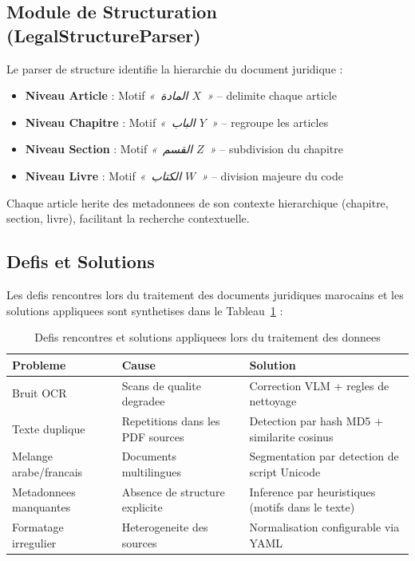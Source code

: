 \subsection{Module de Structuration (LegalStructureParser)}

Le parser de structure identifie la hierarchie du document juridique :

\begin{itemize}
    \item \textbf{Niveau Article} : Motif \textit{«~\textarabic{المادة} $X$~»} -- delimite chaque article
    \item \textbf{Niveau Chapitre} : Motif \textit{«~\textarabic{الباب} $Y$~»} -- regroupe les articles
    \item \textbf{Niveau Section} : Motif \textit{«~\textarabic{القسم} $Z$~»} -- subdivision du chapitre
    \item \textbf{Niveau Livre} : Motif \textit{«~\textarabic{الكتاب} $W$~»} -- division majeure du code
\end{itemize}

Chaque article herite des metadonnees de son contexte hierarchique (chapitre, section, livre), facilitant la recherche contextuelle.

\subsection{Defis et Solutions}

Les defis rencontres lors du traitement des documents juridiques marocains et les solutions appliquees sont synthetises dans le Tableau~\ref{tab:defis-solutions} :

\begin{table}[h]
\centering
\renewcommand{\arraystretch}{1.3}
\begin{tabular}{|p{3.5cm}|p{3.5cm}|p{4.5cm}|}
\hline
\rowcolor{LightBlue}
\textbf{\color{PrimaryBlue}Probleme} & \textbf{\color{PrimaryBlue}Cause} & \textbf{\color{PrimaryBlue}Solution} \\
\hline
Bruit OCR & Scans de qualite degradee & Correction VLM + regles de nettoyage \\
Texte duplique & Repetitions dans les PDF sources & Detection par hash MD5 + similarite cosinus \\
Melange arabe/francais & Documents multilingues & Segmentation par detection de script Unicode \\
Metadonnees manquantes & Absence de structure explicite & Inference par heuristiques (motifs dans le texte) \\
Formatage irregulier & Heterogeneite des sources & Normalisation configurable via YAML \\
\hline
\end{tabular}
\caption{Defis rencontres et solutions appliquees lors du traitement des donnees}
\label{tab:defis-solutions}
\end{table}

